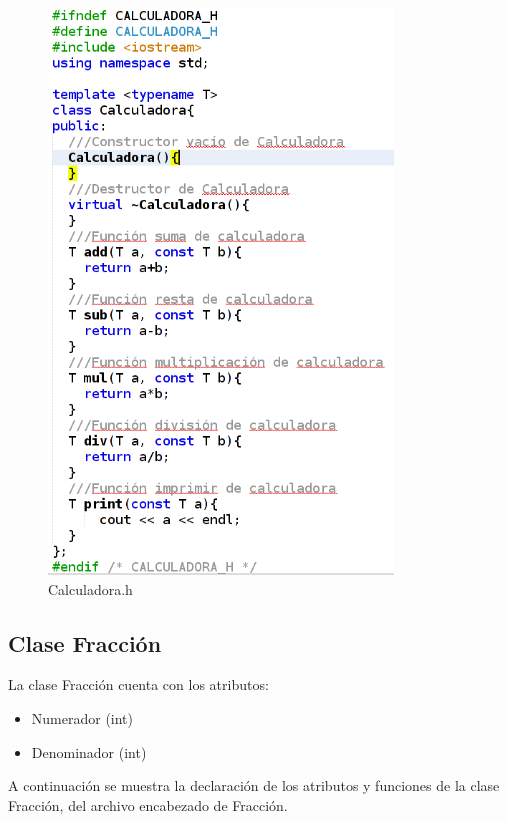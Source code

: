 \documentclass[11pt]{article}
\begin{document}
\begin{figure}[H]
\centering
\includegraphics[height=15cm, width=\textwidth]{img/HeaderCalculadora.png}
\caption{Calculadora.h}
\label{fig:calch}
\end{figure}


\newpage
\subsection{Clase Fracción}

La clase Fracción cuenta con los atributos: 
\begin{itemize}
\item Numerador (int)
\item Denominador (int)
\end{itemize}

A continuación se muestra la declaración de los atributos y funciones de la clase Fracción, del archivo encabezado de Fracción.
\end{document}

